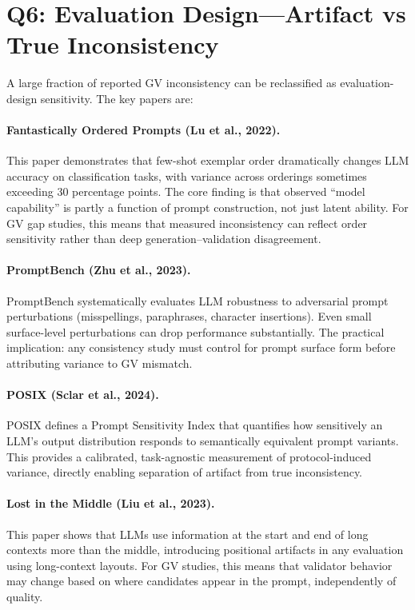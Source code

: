 \documentclass[11pt]{article}
\begin{document}
\section{Q6: Evaluation Design---Artifact vs True Inconsistency}

A large fraction of reported GV inconsistency can be reclassified as evaluation-design sensitivity. The key papers are:

\paragraph{Fantastically Ordered Prompts (Lu et al., 2022).}
This paper demonstrates that few-shot exemplar order dramatically changes LLM accuracy on classification tasks, with variance across orderings sometimes exceeding 30 percentage points. The core finding is that observed ``model capability'' is partly a function of prompt construction, not just latent ability. For GV gap studies, this means that measured inconsistency can reflect order sensitivity rather than deep generation--validation disagreement.

\paragraph{PromptBench (Zhu et al., 2023).}
PromptBench systematically evaluates LLM robustness to adversarial prompt perturbations (misspellings, paraphrases, character insertions). Even small surface-level perturbations can drop performance substantially. The practical implication: any consistency study must control for prompt surface form before attributing variance to GV mismatch.

\paragraph{POSIX (Sclar et al., 2024).}
POSIX defines a Prompt Sensitivity Index that quantifies how sensitively an LLM's output distribution responds to semantically equivalent prompt variants. This provides a calibrated, task-agnostic measurement of protocol-induced variance, directly enabling separation of artifact from true inconsistency.

\paragraph{Lost in the Middle (Liu et al., 2023).}
This paper shows that LLMs use information at the start and end of long contexts more than the middle, introducing positional artifacts in any evaluation using long-context layouts. For GV studies, this means that validator behavior may change based on where candidates appear in the prompt, independently of quality.
\end{document}
